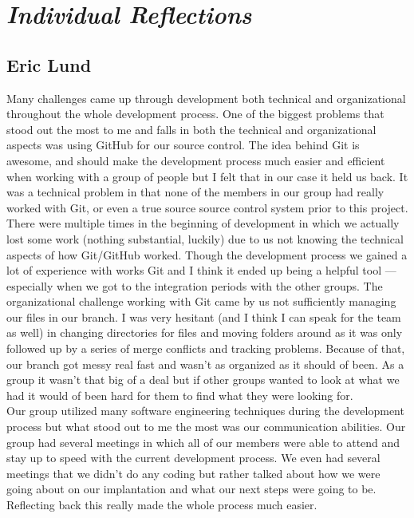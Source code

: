 \documentclass[12pt]{article}
\begin{document}
\newpage
\section{\emph{Individual Reflections}}
\subsection{Eric Lund}
\begin{changemargin}{1cm}{0cm} 
          Many challenges came up through development both technical and organizational throughout the whole development process. One of the biggest problems that stood out the most to me and falls in both the technical and organizational aspects was using GitHub for our source control.  The idea behind Git is awesome, and should make the development process much easier and efficient when working with a group of people but I felt that in our case it held us back. It was a technical problem in that none of the members in our group had really worked with Git, or even a true source source control system prior to this project. There were multiple times in the beginning of development in which we actually lost some work (nothing substantial, luckily) due to us not knowing the technical aspects of how Git/GitHub worked. Though the development process we gained a lot of experience with works Git and I think it ended up being a helpful tool — especially when we got to the integration periods with the other groups. The organizational challenge working with Git came by us not sufficiently managing our files in our branch. I was very hesitant (and I think I can speak for the team as well) in changing directories for files and moving folders around as it was only followed up by a series of merge conflicts and tracking problems. Because of that, our branch got messy real fast and wasn't as organized as it should of been. As a group it wasn't that big of a deal but if other groups wanted to look at what we had it would of been hard for them to find what they were looking for. \\
          
           Our group utilized many software engineering techniques during the development process but what stood out to me the most was our communication abilities. Our group had several meetings in which all of our members were able to attend and stay up to speed with the current development process. We even had several meetings that we didn't do any coding but rather talked about how we were going about on our implantation and what our next steps were going to be. Reflecting back this really made the whole process much easier.\\
           

\end{changemargin}
\end{document}
